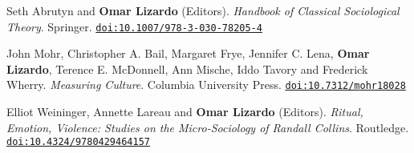 \ind Seth Abrutyn and {\bf Omar Lizardo} (Editors). {\em Handbook of Classical Sociological Theory}. Springer. \href{https://doi.org/10.1007/978-3-030-78205-4}{\nolinkurl{doi:10.1007/978-3-030-78205-4}}

\ind John Mohr, Christopher A. Bail, Margaret Frye, Jennifer C. Lena, {\bf Omar Lizardo}, Terence E. McDonnell, Ann Mische, Iddo Tavory and Frederick Wherry. {\em Measuring Culture}. Columbia University Press. \href{https://doi.org/10.7312/mohr18028}{\nolinkurl{doi:10.7312/mohr18028}}

\ind Elliot Weininger, Annette Lareau and {\bf Omar Lizardo} (Editors). {\em Ritual, Emotion, Violence: Studies on the Micro-Sociology of Randall Collins}. Routledge. \href{https://doi.org/10.4324/9780429464157}{\nolinkurl{doi:10.4324/9780429464157}}


